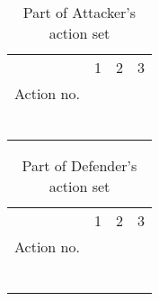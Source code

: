 \documentclass[10pt, conference, compsocconf]{IEEEtran}
\begin{document}
\begin{table}[h]
\scriptsize
\centering
\caption{\label{attckeraction} Part of Attacker's action set}
\newcommand{\Rownb}{\stepcounter{Rownumberb}\theRownumberb}
\begin{tabular}{cccc}\hline
  &  1      &  2       & 3         \\
Action no.             &         &          &           \\\hline
\Rownb             & & &\\
\Rownb             &  & &  \\
\Rownb             &  & &  \\
\Rownb             &  & &  \\
\Rownb       &  &&\\
\Rownb       & &     &   \\
\hline
\end{tabular}
\end{table}

\begin{table}[h]
\caption{\label{defenderaction} Part of Defender's action set}
\centering
\scriptsize
{}
\newcommand{\Rowna}{\stepcounter{Rownumbera}\theRownumbera}
\renewcommand{\multirowsetup}{\centering}
\begin{tabular}{cccc}\hline
  &  1      &  2       & 3         \\
Action no.             &         &          &           \\\hline
\Rowna                 &   &    &     \\
\Rowna                 &   &    &     \\
\Rowna                 &  & &\\
\Rowna                 &   & &\\
\Rowna    & &  &   \\
\Rowna    &  &  &   \\
\hline
\end{tabular}
\end{table}
\end{document}
